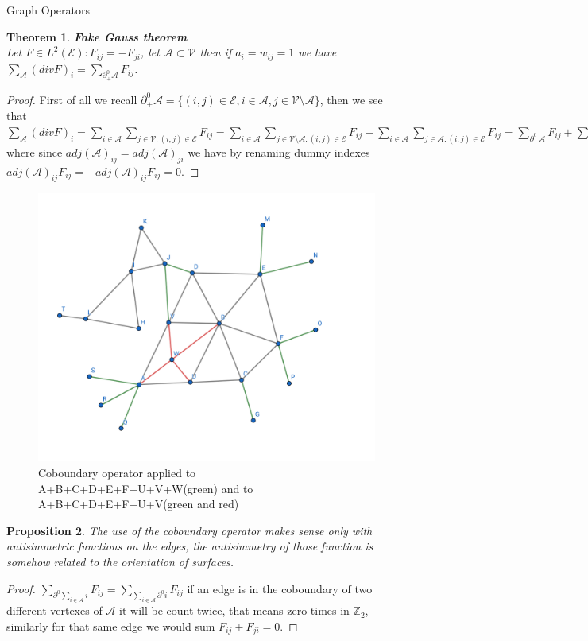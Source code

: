 \documentclass{article}
\newtheorem{thm}{Theorem}[section]
\newtheorem{prop}[thm]{Proposition}
\newcommand{\bb}[1]{\textbf{#1}}
\newcommand{\Z}{\mathbb{Z}}
\newcommand{\mc}{\mathcal}
\begin{document}
\begin{section}{Graph Operators}
	\begin{thm}
	    \bb{Fake Gauss theorem}\\
	    Let $F \in L^2(\mc{E}) : F_{ij}=-F_{ji}$, let $\mc{A} \subset \mc{V}$ then if $a_i = w_{ij} = 1$ we have
	    $\sum_{\mc{A}} (divF)_i = \sum_{\partial_+^0 \mc{A}} F_{ij}$.
	\end{thm}
	\begin{proof}
	    First of all we recall $\partial_+^0 \mc{A} = \{ (i,j) \in \mc{E}, i \in \mc{A}, j \in \mc{V \setminus A} \}$, then we see that
            $\sum_{\mc{A}} (divF)_i = \sum_{i \in \mc{A}}\sum_{j \in \mc{V} : (i,j) \in \mc{E}} F_{ij} =
	    \sum_{i \in \mc{A}}\sum_{j \in \mc{V \setminus A} : (i,j) \in \mc{E}} F_{ij} +
            \sum_{i \in \mc{A}}\sum_{j \in \mc{A} : (i,j) \in \mc{E}} F_{ij} = \sum_{\partial_+^0 \mc{A}} F_{ij} + \sum_{(i,j) \in \mc{A}^2} adj(\mc{A})_{ij} F_{ij}$
	    where since $adj(\mc{A})_{ij} = adj(\mc{A})_{ji}$ we have by renaming dummy indexes $adj(\mc{A})_{ij} F_{ij} = -adj(\mc{A})_{ij} F_{ij} = 0$.
        \end{proof}
	\begin{figure}[h]
	    \caption{Coboundary operator applied to A+B+C+D+E+F+U+V+W(green) and to A+B+C+D+E+F+U+V(green and red)}
	    \centering
            \includegraphics[scale = 0.3]{images/cobordo.jpg}
	\end{figure}
	
	\begin{prop}
	    The use of the coboundary operator makes sense only with antisimmetric functions on the edges, the antisimmetry of
	    those function is somehow related to the orientation of surfaces.
	\end{prop}
	\begin{proof}
	    $\sum_{\partial^0 \sum_{i \in \mc{A}} i}F_{ij} = \sum_{\sum_{i \in \mc{A}} \partial^0 i} F_{ij}$ if an edge
	    is in the coboundary of two different vertexes of $\mc{A}$ it will be count twice, that means zero times in $\Z_2$,
	    similarly for that same edge we would sum $F_{ij} + F_{ji} = 0$.
	\end{proof}


\end{section}
\end{document}
